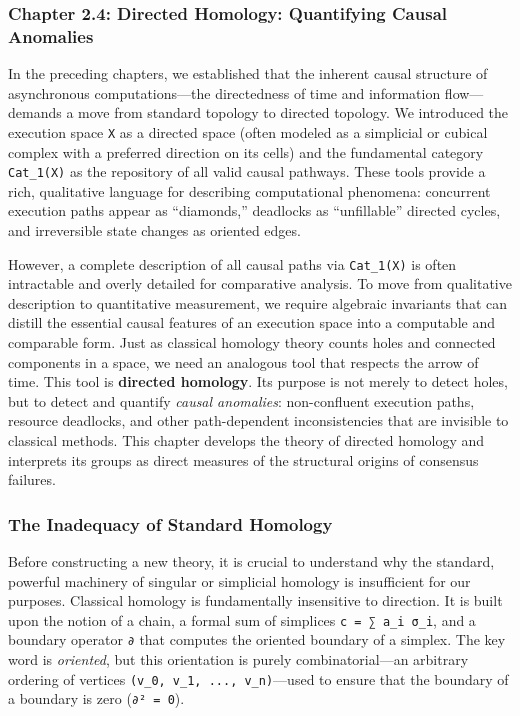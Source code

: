 \documentclass[
]{article}
\begin{document}
\subsubsection{Chapter 2.4: Directed Homology: Quantifying Causal
Anomalies}\label{chapter-2.4-directed-homology-quantifying-causal-anomalies}

\protect{}\label{chapter-2-4-Directed_Homology__Quantifying_Causal_An}{}

In the preceding chapters, we established that the inherent causal
structure of asynchronous computations---the directedness of time and
information flow---demands a move from standard topology to directed
topology. We introduced the execution space \texttt{X} as a directed
space (often modeled as a simplicial or cubical complex with a preferred
direction on its cells) and the fundamental category \texttt{Cat\_1(X)}
as the repository of all valid causal pathways. These tools provide a
rich, qualitative language for describing computational phenomena:
concurrent execution paths appear as ``diamonds,'' deadlocks as
``unfillable'' directed cycles, and irreversible state changes as
oriented edges.

However, a complete description of all causal paths via
\texttt{Cat\_1(X)} is often intractable and overly detailed for
comparative analysis. To move from qualitative description to
quantitative measurement, we require algebraic invariants that can
distill the essential causal features of an execution space into a
computable and comparable form. Just as classical homology theory counts
holes and connected components in a space, we need an analogous tool
that respects the arrow of time. This tool is \textbf{directed
homology}. Its purpose is not merely to detect holes, but to detect and
quantify \emph{causal anomalies}: non-confluent execution paths,
resource deadlocks, and other path-dependent inconsistencies that are
invisible to classical methods. This chapter develops the theory of
directed homology and interprets its groups as direct measures of the
structural origins of consensus failures.

\subsubsection{The Inadequacy of Standard
Homology}\label{the-inadequacy-of-standard-homology}

Before constructing a new theory, it is crucial to understand why the
standard, powerful machinery of singular or simplicial homology is
insufficient for our purposes. Classical homology is fundamentally
insensitive to direction. It is built upon the notion of a chain, a
formal sum of simplices \texttt{c\ =\ ∑\ a\_i\ σ\_i}, and a boundary
operator \texttt{∂} that computes the oriented boundary of a simplex.
The key word is \emph{oriented}, but this orientation is purely
combinatorial---an arbitrary ordering of vertices
\texttt{(v\_0,\ v\_1,\ ...,\ v\_n)}---used to ensure that the boundary
of a boundary is zero (\texttt{∂²\ =\ 0}).
\end{document}
